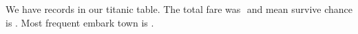 \documentclass[preview]{standalone}
\begin{document}
%

%




We have  records in our titanic table. The total fare was $$  and mean survive chance is .
Most frequent embark town is .


\end{document}

